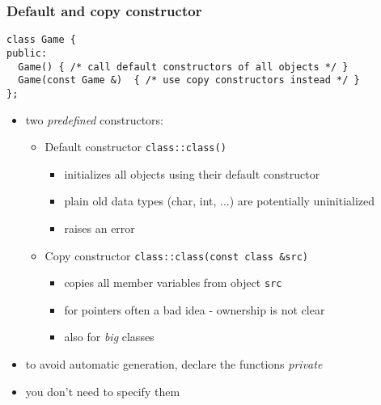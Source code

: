 \documentclass{slides}
\begin{document}
\begin{frame}[fragile]
  \frametitle{Default and copy constructor}

\begin{lstlisting}
class Game {
public:
  Game() { /* call default constructors of all objects */ }
  Game(const Game &)  { /* use copy constructors instead */ }
};
\end{lstlisting}

  \begin{itemize}
  \item two \emph{predefined} constructors:
    \begin{itemize}
    \item Default constructor \lstinline!class::class()!
      \begin{itemize}
      \item initializes all objects using their default constructor
      \item plain old data types (char, int, ...) are potentially
        uninitialized
      \item raises an error
      \end{itemize}
    \item Copy constructor \lstinline!class::class(const class &src)!
      \begin{itemize}
      \item copies all member variables from object \lstinline!src!
      \item for pointers often a bad idea - ownership is not clear
      \item also for \emph{big} classes
      \end{itemize}
    \end{itemize}
  \item to avoid automatic generation, declare the functions
    \emph{private}
  \item you don't need to specify them
  \end{itemize}
\end{frame}
\end{document}
